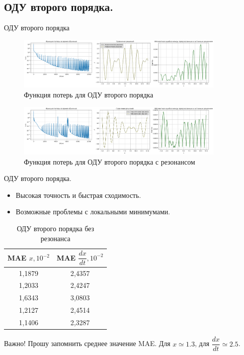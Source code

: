 \documentclass{beamer}
\begin{document}
\subsection{ОДУ второго порядка.}
\begin{frame}{ОДУ второго порядка}
    \begin{figure}[h!]
        \centering
        \includegraphics[width=0.9\textwidth]{images/Loss&x_ODE_of_the_second_order.png}
        \caption{Функция потерь для ОДУ второго порядка}
        \label{fig:loss_second_order}
    \end{figure}
    \begin{figure}[h!]
        \centering
        \includegraphics[width=0.9\textwidth]{images/Loss&x_ODE_of_the_second_order_resonance.png}
        \caption{Функция потерь для ОДУ второго порядка с резонансом}
        \label{fig:loss_second_order_resonance}
    \end{figure}
\end{frame}

\begin{frame}{ОДУ второго порядка.}
    \begin{itemize}
        \item Высокая точность и быстрая сходимость.
        \item Возможные проблемы с локальными минимумами.
    \end{itemize}
    \begin{table}[h!]
        \centering
        \begin{tabular}{|c|c|}
        \hline
        \textbf{MAE $x, 10^{-2}$} & \textbf{MAE $\dfrac{dx}{dt}, 10^{-2}$} \\
        \hline
        1,1879 & 2,4357 \\
        1,2033 & 2,4247 \\
        1,6343 & 3,0803 \\
        1,2127 & 2,4514 \\
        1,1406 & 2,3287 \\
        \hline
        \end{tabular}
        \caption{ОДУ второго порядка без резонанса}
    \end{table}

    \begin{alertblock}{Важно!}
        Прошу запомнить среднее значение MAE. Для $x \simeq 1.3$, для $\dfrac{dx}{dt} \simeq 2.5$.
    \end{alertblock}
\end{frame}
\end{document}
